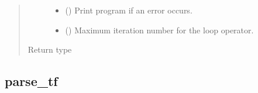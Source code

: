 \documentclass[letterpaper,10pt,english]{sphinxmanual}
\begin{document}
\begin{fulllineitems}
\begin{quote}
\begin{description}
\begin{itemize}
\item {} 
\sphinxAtStartPar
{} () \textendash{} Print program if an error occurs.

\item {} 
\sphinxAtStartPar
{} () \textendash{} Maximum iteration number for the loop operator.

\end{itemize}

\item[{Return type}] \leavevmode
\sphinxAtStartPar
{\hyperref[\detokenize{reference/py:migraphx.program}]{}}

\end{description}\end{quote}

\end{fulllineitems}



\subsection{parse\_tf}
\label{\detokenize{reference/py:parse-tf}}
\end{document}
